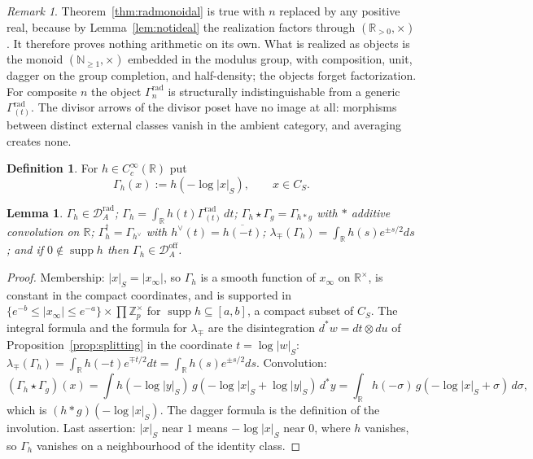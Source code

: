 \documentclass[11pt]{amsart}
\newtheorem{lemma}[theorem]{Lemma}
\theoremstyle{definition}
\newtheorem{definition}[theorem]{Definition}
\theoremstyle{remark}
\newtheorem{remark}[theorem]{Remark}
\newcommand{\R}{\mathbb R}
\newcommand{\N}{\mathbb N}
\newcommand{\Z}{\mathbb Z}
\newcommand{\supp}{\operatorname{supp}}
\newcommand{\Drad}{\mathcal D_A^{\mathrm{rad}}}
\newcommand{\Doff}{\mathcal D_A^{\mathrm{off}}}
\begin{document}
\begin{remark}\label{rem:whatisrealized}
Theorem~\ref{thm:radmonoidal} is true with $n$ replaced by any positive real,
because by Lemma~\ref{lem:notideal} the realization factors through
$(\R_{>0},\times)$. It therefore proves nothing arithmetic on its own. What is
realized as objects is the monoid $(\N_{\ge1},\times)$ embedded in the modulus
group, with composition, unit, dagger on the group completion, and
half-density; the objects forget factorization. For composite $n$ the object
$\Gamma_n^{\mathrm{rad}}$ is structurally indistinguishable from a generic
$\Gamma^{\mathrm{rad}}_{(t)}$. The divisor arrows of the divisor poset have no
image at all: morphisms between distinct external classes vanish in the
ambient category, and averaging creates none.
\end{remark}

\begin{definition}\label{def:smeared}
For $h\in C_c^\infty(\R)$ put
\begin{equation}\label{eq:smeared}
   \Gamma_h(x):=h(-\log|x|_S),\qquad x\in C_S .
\end{equation}
\end{definition}

\begin{lemma}\label{lem:smeared}
$\Gamma_h\in\Drad$; $\Gamma_h=\int_\R h(t)\Gamma^{\mathrm{rad}}_{(t)}\,dt$;
$\Gamma_h\star\Gamma_g=\Gamma_{h*g}$ with $*$ additive convolution on $\R$;
$\Gamma_h^\dagger=\Gamma_{h^\vee}$ with $h^\vee(t)=\overline{h(-t)}$;
$\lambda_\mp(\Gamma_h)=\int_\R h(s)e^{\pm s/2}ds$; and if $0\notin\supp h$ then
$\Gamma_h\in\Doff$.
\end{lemma}

\begin{proof}
Membership: $|x|_S=|x_\infty|$, so $\Gamma_h$ is a smooth function of
$x_\infty$ on $\R^\times$, is constant in the compact coordinates, and is
supported in $\{e^{-b}\le|x_\infty|\le e^{-a}\}\times\prod\Z_p^\times$ for
$\supp h\subseteq[a,b]$, a compact subset of $C_S$. The integral formula and
the formula for $\lambda_\mp$ are the disintegration $d^*w=dt\otimes du$ of
Proposition~\ref{prop:splitting} in the coordinate $t=\log|w|_S$:
$\lambda_\mp(\Gamma_h)=\int_\R h(-t)e^{\mp t/2}dt=\int_\R h(s)e^{\pm s/2}ds$.
Convolution:
\[
  (\Gamma_h\star\Gamma_g)(x)=\int h(-\log|y|_S)\,g(-\log|x|_S+\log|y|_S)\,d^*y
   =\int_\R h(-\sigma)\,g(-\log|x|_S+\sigma)\,d\sigma,
\]
which is $(h*g)(-\log|x|_S)$.
The dagger formula is the definition of the involution. Last assertion: $|x|_S$
near $1$ means $-\log|x|_S$ near $0$, where $h$ vanishes, so $\Gamma_h$
vanishes on a neighbourhood of the identity class.
\end{proof}
\end{document}
